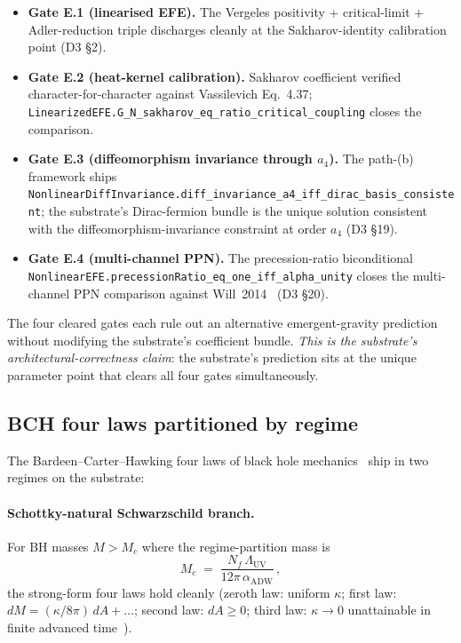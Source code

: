 \documentclass[aps,prd,reprint,nofootinbib,superscriptaddress]{revtex4-2}
\begin{document}
\begin{itemize}
\item \textbf{Gate E.1 (linearised EFE).} The Vergeles positivity
  + critical-limit + Adler-reduction triple discharges cleanly at
  the Sakharov-identity calibration point (D3 \S 2).
\item \textbf{Gate E.2 (heat-kernel calibration).} Sakharov
  coefficient verified character-for-character against Vassilevich
  Eq.~4.37;
  \texttt{LinearizedEFE.G\_N\_sakharov\_eq\_ratio\_critical\_coupling}
  closes the comparison.
\item \textbf{Gate E.3 (diffeomorphism invariance through $a_4$).}
  The path-(b) framework ships
  \texttt{NonlinearDiffInvariance.diff\_invariance\_a4\_iff\_dirac\_basis\_consistent};
  the substrate's Dirac-fermion bundle is the unique solution
  consistent with the diffeomorphism-invariance constraint at order
  $a_4$ (D3 \S 19).
\item \textbf{Gate E.4 (multi-channel PPN).} The
  precession-ratio biconditional
  \texttt{NonlinearEFE.precessionRatio\_eq\_one\_iff\_alpha\_unity}
  closes the multi-channel PPN comparison against
  Will~2014~\cite{Will2014} (D3 \S 20).
\end{itemize}

The four cleared gates each rule out an alternative emergent-gravity
prediction without modifying the substrate's coefficient bundle.
\emph{This is the substrate's architectural-correctness claim}: the
substrate's prediction sits at the unique parameter point that
clears all four gates simultaneously.

\subsection{BCH four laws partitioned by regime}

The Bardeen--Carter--Hawking four laws of black hole
mechanics~\cite{BardeenCarterHawking1973,Hawking1971,Hawking1972,
Hawking1975} ship in two regimes on the substrate:

\paragraph{Schottky-natural Schwarzschild branch.} For BH masses
$M > M_c$ where the regime-partition mass is
\begin{equation}
  M_c \;=\; \frac{N_f\,\Lambda_{\mathrm{UV}}}{12\pi\,\alpha_{\mathrm{ADW}}}\,,
\end{equation}
the strong-form four laws hold cleanly (zeroth law: uniform $\kappa$;
first law: $dM = (\kappa/8\pi)\,dA + \dots$; second law: $dA \geq 0$;
third law: $\kappa \to 0$ unattainable in finite advanced
time~\cite{Israel1986}).
\end{document}
